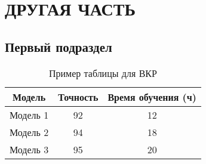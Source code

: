 \section{ДРУГАЯ ЧАСТЬ}

\subsection{Первый подраздел}

\begin{table}[h]
    \centering
    \caption{Пример таблицы для ВКР}
    \label{tab:example}
    \begin{tabular}{|c|c|c|}
        \hline
        \textbf{Модель} & \textbf{Точность} & \textbf{Время обучения (ч)} \\ \hline
        Модель 1        & 92                & 12                          \\ \hline
        Модель 2        & 94                & 18                          \\ \hline
        Модель 3        & 95                & 20                          \\ \hline
    \end{tabular}
\end{table}


